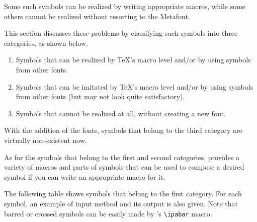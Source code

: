 Some such symbols can be realized by writing appropriate
macros, while some others cannot be realized without resorting to
the Metafont.

This section discusses these problems by classifying such symbols into
three categories, as shown below.

\begin{enumerate}
\itemsep0pt
\item Symbols that can be realized by \TeX{}'s macro level and/or by using
  symbols from other fonts.
\item Symbols that can be imitated by \TeX{}'s macro level and/or by using
  symbols from other fonts (but may not look quite satisfactory).
\item Symbols that cannot be realized at all, without creating a new
  font.
\end{enumerate}

With the addition of the \tipx{} fonts, symbols that belong to the
third category are virtually non-existent now.

As for the symbols that belong to the first and second categories,
\tipa{} provides a variety of macros and parts of symbols that can be
used to compose a desired symbol if you can write an appropriate
macro for it.

The following table shows symbols that belong to the first category.
For each symbol, an example of input method and its output is also
given. Note that barred or crossed symbols can be easily made by
\tipa{}'s \verb|\ipabar| macro.

\def\SecLine{\>}

